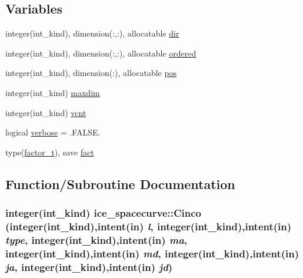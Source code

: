 \subsection*{Variables}
\begin{DoxyCompactItemize}
\item 
integer(int\_\-kind), dimension(:,:), allocatable \hyperlink{namespaceice__spacecurve_a39f2092f453a0a651c4efda8291bc0cf}{dir}
\item 
integer(int\_\-kind), dimension(:,:), allocatable \hyperlink{namespaceice__spacecurve_a1338f6fba84ddb72ad229795cc040231}{ordered}
\item 
integer(int\_\-kind), dimension(:), allocatable \hyperlink{namespaceice__spacecurve_a440379dc8df1be7a6903b0df94d181b1}{pos}
\item 
integer(int\_\-kind) \hyperlink{namespaceice__spacecurve_aee0a00b4e25e4f5c770a300d2093feb7}{maxdim}
\item 
integer(int\_\-kind) \hyperlink{namespaceice__spacecurve_ad07b7ca9c91db52f0cee81fac7c71c5a}{vcnt}
\item 
logical \hyperlink{namespaceice__spacecurve_a486a46d8f8d78fea131f7fe3d429b0dc}{verbose} = .FALSE.
\item 
type(\hyperlink{typeice__spacecurve_1_1factor__t}{factor\_\-t}), save \hyperlink{namespaceice__spacecurve_aa520de333aa94f300555f836420d5b30}{fact}
\end{DoxyCompactItemize}


\subsection{Function/Subroutine Documentation}
\hypertarget{namespaceice__spacecurve_a03cdfff51ffab50dee8974ba594b53bb}{
\subsubsection[{Cinco}]{\setlength{\rightskip}{0pt plus 5cm}integer(int\_\-kind) ice\_\-spacecurve::Cinco (integer(int\_\-kind),intent(in) {\em l}, \/  integer(int\_\-kind),intent(in) {\em type}, \/  integer(int\_\-kind),intent(in) {\em ma}, \/  integer(int\_\-kind),intent(in) {\em md}, \/  integer(int\_\-kind),intent(in) {\em ja}, \/  integer(int\_\-kind),intent(in) {\em jd})}}
\label{namespaceice__spacecurve_a03cdfff51ffab50dee8974ba594b53bb}


